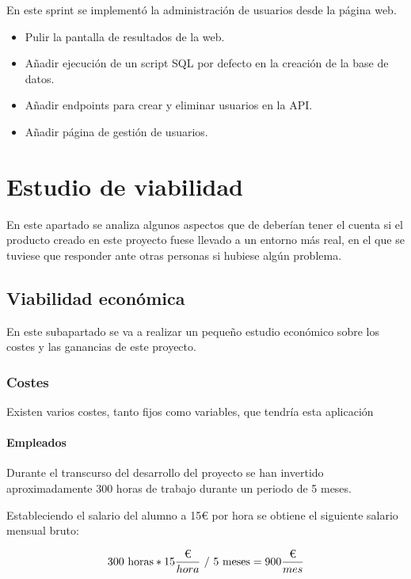 En este sprint se implementó la administración de usuarios desde la página web.

\begin{itemize}
    \item Pulir la pantalla de resultados de la web.
    \item Añadir ejecución de un script SQL por defecto en la creación de la
    base de datos.
    \item Añadir endpoints para crear y eliminar usuarios en la API.
    \item Añadir página de gestión de usuarios.
\end{itemize}

\section{Estudio de viabilidad}

En este apartado se analiza algunos aspectos que de deberían tener el cuenta si
el producto creado en este proyecto fuese llevado a un entorno más real, en el
que se tuviese que responder ante otras personas si hubiese algún problema.

\subsection{Viabilidad económica}

En este subapartado se va a realizar un pequeño estudio económico sobre los
costes y las ganancias de este proyecto.

\subsubsection{Costes}

Existen varios costes, tanto fijos como variables, que tendría esta aplicación

\paragraph{Empleados}

Durante el transcurso del desarrollo del proyecto se han invertido
aproximadamente 300 horas de trabajo durante un periodo de 5 meses.

Estableciendo el salario del alumno a 15€ por hora se obtiene el siguiente
salario mensual bruto:

$$
300\text{ horas} * 15 \frac{\textup{€}}{hora} \text{ / } 5\text{ meses} = 900 \frac{\textup{€}}{mes}
$$

